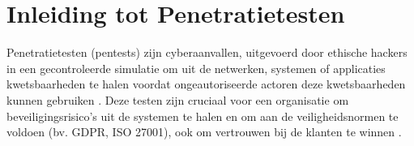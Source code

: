 



\section{Inleiding tot Penetratietesten}
Penetratietesten (pentests) zijn cyberaanvallen, uitgevoerd door ethische hackers in een gecontroleerde simulatie om uit de netwerken, systemen of applicaties kwetsbaarheden te halen voordat ongeautoriseerde actoren deze kwetsbaarheden kunnen gebruiken \textcite{Shebli}. 
Deze testen zijn cruciaal voor een organisatie om beveiligingsrisico's uit de systemen te halen en om aan de veiligheidsnormen te voldoen (bv. GDPR, ISO 27001), ook om vertrouwen bij de klanten te winnen \parencite{Dalalana2017}.

